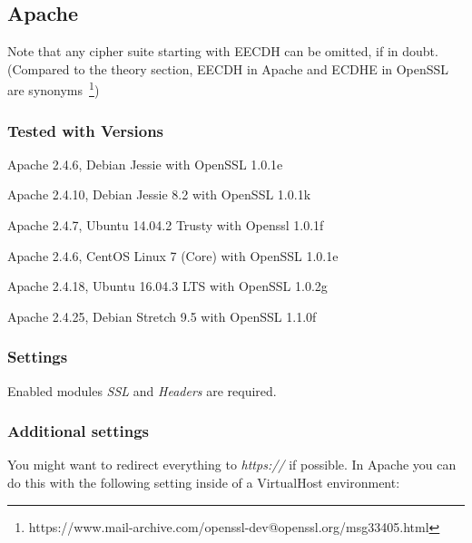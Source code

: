 \subsection{Apache}

Note that any cipher suite starting with EECDH can be omitted, if in doubt.
(Compared to the theory section, EECDH in Apache and ECDHE in OpenSSL are
synonyms~\footnote{https://www.mail-archive.com/openssl-dev@openssl.org/msg33405.html})

\subsubsection{Tested with Versions}
\begin{itemize*}
  \item Apache 2.4.6, Debian Jessie with OpenSSL 1.0.1e
  \item Apache 2.4.10, Debian Jessie 8.2 with OpenSSL 1.0.1k
  \item Apache 2.4.7, Ubuntu 14.04.2 Trusty with Openssl 1.0.1f
  \item Apache 2.4.6, CentOS Linux 7 (Core) with OpenSSL 1.0.1e
  \item Apache 2.4.18, Ubuntu 16.04.3 LTS with OpenSSL 1.0.2g
  \item Apache 2.4.25, Debian Stretch 9.5 with OpenSSL 1.1.0f
\end{itemize*}

\subsubsection{Settings}
Enabled modules \emph{SSL} and \emph{Headers} are required.


\subsubsection{Additional settings}
You might want to redirect everything to \emph{https://} if possible. In Apache
you can do this with the following setting inside of a VirtualHost environment:



